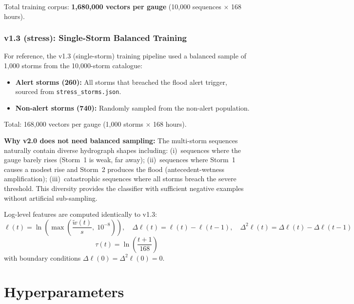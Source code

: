 \documentclass[11pt,a4paper]{article}
\begin{document}
\noindent Total training corpus: \textbf{1{,}680{,}000 vectors per gauge}
(10{,}000 sequences $\times$ 168 hours).

\subsubsection{v1.3 (stress): Single-Storm Balanced Training}

For reference, the v1.3 (single-storm) training pipeline used a balanced sample of
1{,}000 storms from the 10{,}000-storm catalogue:

\begin{itemize}[nosep]
    \item \textbf{Alert storms (260):} All storms that breached the flood alert trigger,
          sourced from \texttt{stress\_storms.json}.
    \item \textbf{Non-alert storms (740):} Randomly sampled from the non-alert population.
\end{itemize}

Total: 168{,}000 vectors per gauge (1{,}000 storms $\times$ 168 hours).

\textbf{Why v2.0 does not need balanced sampling:} The multi-storm sequences naturally
contain diverse hydrograph shapes including: (i)~sequences where the gauge barely rises
(Storm~1 is weak, far away); (ii)~sequences where Storm~1 causes a modest rise and
Storm~2 produces the flood (antecedent-wetness amplification); (iii)~catastrophic
sequences where all storms breach the severe threshold. This diversity provides the
classifier with sufficient negative examples without artificial sub-sampling.

Log-level features are computed identically to v1.3:
\[
\ell(t) = \ln\!\left(\max\!\left(\frac{\tilde{w}(t)}{s},\; 10^{-8}\right)\right),
\quad
\Delta\ell(t) = \ell(t) - \ell(t{-}1), \quad
\Delta^2\ell(t) = \Delta\ell(t) - \Delta\ell(t{-}1)
\]
\[
\tau(t) = \ln\!\left(\frac{t + 1}{168}\right)
\]
with boundary conditions $\Delta\ell(0) = \Delta^2\ell(0) = 0$.

\section{Hyperparameters}
\label{sec:hyperparameters}
\end{document}
